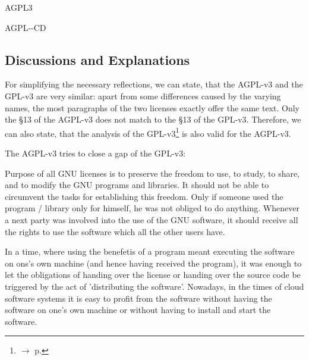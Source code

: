 \begin{license}{AGPL3}
\begin{lsuc}{AGPL-\ver-CD}
  \begin{lsucprohibits}
    \lsucitem{\noPatentLitigation}
  \end{lsucprohibits}
\end{lsuc}
\end{license}


\subsection{Discussions and Explanations}
\label{AGPL3Discussion}
  
For simplifying the necessary reflections, we can state, that the AGPL-v3 and
the GPL-v3 are very similar: apart from some differences caused by the
varying names, the most paragraphs of the two licenses exactly offer the same
text. Only the §13 of the AGPL-v3 does not match to the §13 of the GPL-v3.
Therefore, we can also state, that the analysis of the
GPL-v3\footnote{$\rightarrow$ p. \pageref{GPL3Discussion}} is also valid for the
AGPL-v3.

The AGPL-v3 tries to close a gap of the GPL-v3: 

Purpose of all GNU licenses is to preserve the freedom to use, to study, to
share, and to modify the GNU programs and libraries. It should not be able to
circumvent the tasks for establishing this freedom. Only if someone used the
program / library only for himself, he was not obliged to do anything. Whenever
a next party was involved into the use of the GNU software, it should receive
all the rights to use the software which all the other users have.

 In a time, where using the benefetis of
a program meant executing the software on ons's own machine (and hence having received the program), it was enough to let the obligations of handing over the license or handing over the source code be triggered by the act of 'distributing
the software'. Nowadays, in the times of cloud software systems it is easy to
profit from the software without having the software on one's own machine or
without having to install and start the software.

